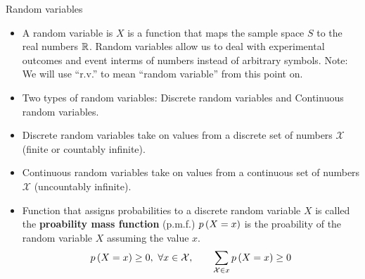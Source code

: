 \documentclass[aspectratio=169]{beamer}
\let\olditem\item
\renewcommand{\item}{\setlength{\itemsep}{\fill}\olditem}
\def\mb{\ensuremath\mathbb}
\def\mc{\ensuremath\mathcal}
\def\lp{\ensuremath\left(}
\def\rp{\ensuremath\right)}
\newcommand{\ct}[1]{\lp #1\rp}
\begin{document}
\begin{frame}[t]{Random variables}
\begin{itemize}
  \item A random variable is $X$ is a function that maps the sample space $S$ to the real numbers $\mb{R}$. Random variables allow us to deal with experimental outcomes and event interms of numbers instead of arbitrary symbols. Note: We will use ``r.v.'' to mean ``random variable'' from this point on.
  
  \item Two types of random variables: Discrete random variables and Continuous random variables.
  
  \item Discrete random variables take on values from a discrete set of numbers $\mathcal{X}$ (finite or countably infinite).
  
  \item Continuous random variables take on values from a continuous set of numbers $\mathcal{X}$ (uncountably infinite).
  
  \item Function that assigns probabilities to a discrete random variable $X$ is called the \textbf{proability mass function} (p.m.f.) $p\ct{X = x}$ is the proability of the random variable $X$ assuming the value $x$.
  \[ p\ct{X = x} \geq 0, \,\,  \forall x \in \mc{X}, \quad \quad \sum_{\mc{X} \in x} p\ct{X = x} \geq 0 \]
\end{itemize}
\end{frame}
\end{document}
